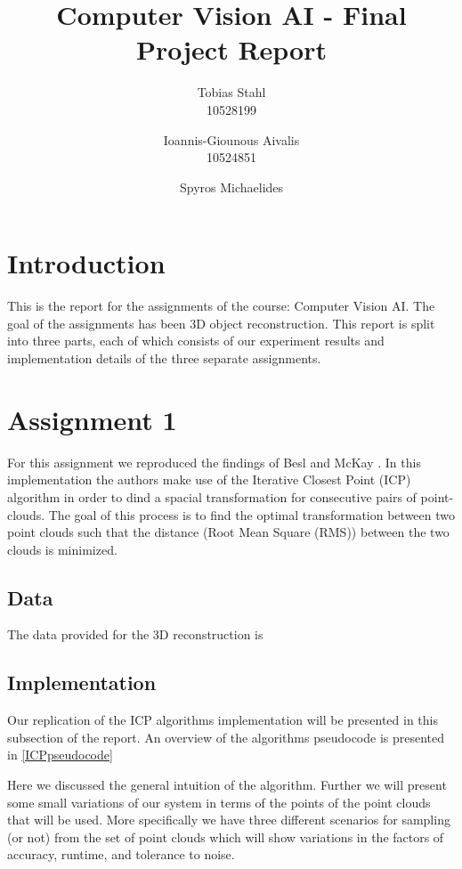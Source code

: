 \documentclass[11pt]{article}
\title{
	\textbf{Computer Vision AI - Final Project Report}
}
\author{Tobias Stahl \\ 10528199 \and Ioannis-Giounous Aivalis \\ 10524851  \and Spyros Michaelides}
\begin{document}
\maketitle

\section{Introduction}
This is the report for the assignments of the course: Computer Vision AI. The goal of the assignments has been 3D object reconstruction. This report is split into three parts, each of which consists of our experiment results and implementation details of the three separate assignments.
  
\section{Assignment 1}
For this assignment we reproduced the findings of Besl and McKay \cite{besl}. In this implementation the authors make use of the Iterative Closest Point (ICP) algorithm in order to dind a spacial transformation for consecutive pairs of point-clouds. The goal of this process is to find the optimal transformation between two point clouds such that the distance (Root Mean Square (RMS)) between the two clouds is minimized.

\subsection{Data}
\label{ICPDataSection}
The data provided for the 3D reconstruction is 

\subsection{Implementation}
\label{ICPImplementation}
Our replication of the ICP algorithms implementation will be presented in this subsection of the report. An overview of the algorithms pseudocode is presented in \ref{ICPpseudocode}



Here we discussed the general intuition of the algorithm. Further we will present some small variations of our system in terms of the points of the point clouds that will be used. More specifically we have three different scenarios for sampling (or not) from the set of point clouds which will show variations in the factors of accuracy, runtime, and tolerance to noise.
\end{document}
